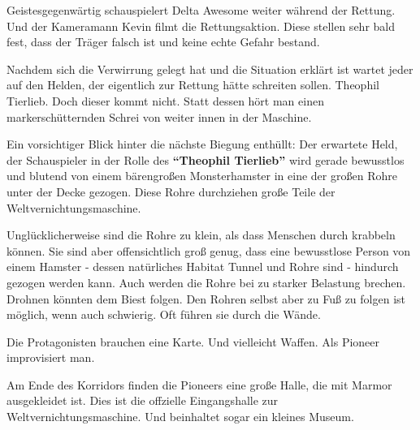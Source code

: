 Geistesgegenwärtig schauspielert Delta Awesome weiter während der Rettung. Und der Kameramann Kevin filmt die Rettungsaktion. Diese stellen sehr bald fest, dass der Träger falsch ist und keine echte Gefahr bestand.

Nachdem sich die Verwirrung gelegt hat und die Situation erklärt ist wartet jeder auf den Helden, der eigentlich zur Rettung hätte schreiten sollen. Theophil Tierlieb. Doch dieser kommt nicht. Statt dessen hört man einen markerschütternden Schrei von weiter innen in der Maschine.

Ein vorsichtiger Blick hinter die nächste Biegung enthüllt: Der erwartete Held, der Schauspieler in der Rolle des \textbf{\enquote{Theophil Tierlieb}} wird gerade bewusstlos und blutend von einem bärengroßen Monsterhamster in eine der großen Rohre unter der Decke gezogen. Diese Rohre durchziehen große Teile der Weltvernichtungsmaschine.

Unglücklicherweise sind die Rohre zu klein, als dass Menschen durch krabbeln können. Sie sind aber offensichtlich groß genug, dass eine bewusstlose Person von einem Hamster - dessen natürliches Habitat Tunnel und Rohre sind - hindurch gezogen werden kann. Auch werden die Rohre bei zu starker Belastung brechen. Drohnen könnten dem Biest folgen. Den Rohren selbst aber zu Fuß zu folgen ist möglich, wenn auch schwierig. Oft führen sie durch die Wände.

Die Protagonisten brauchen eine Karte. Und vielleicht Waffen. Als Pioneer improvisiert man.

Am Ende des Korridors finden die Pioneers eine große Halle, die mit Marmor ausgekleidet ist. Dies ist die offzielle Eingangshalle zur Weltvernichtungsmaschine. Und beinhaltet sogar ein kleines Museum.

